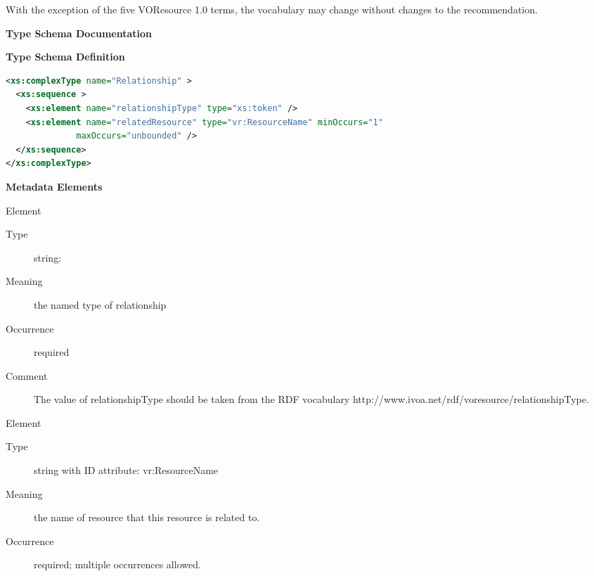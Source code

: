 \documentclass[11pt,a4paper]{ivoa}
\begin{document}
With the exception of the five VOResource 1.0 terms, the vocabulary may
change without changes to the recommendation.

\begingroup
      	\renewcommand*\descriptionlabel[1]{%
      	\hbox to 5.5em{\emph{#1}\hfil}}\vspace{2ex}\noindent\textbf{ Type Schema Documentation}


\vspace{1ex}\noindent\textbf{ Type Schema Definition}

\begin{lstlisting}[language=XML,basicstyle=\footnotesize]
<xs:complexType name="Relationship" >
  <xs:sequence >
    <xs:element name="relationshipType" type="xs:token" />
    <xs:element name="relatedResource" type="vr:ResourceName" minOccurs="1"
              maxOccurs="unbounded" />
  </xs:sequence>
</xs:complexType>
\end{lstlisting}

\vspace{0.5ex}\noindent\textbf{ Metadata Elements}

\begingroup\small\begin{bigdescription}\item[Element \xmlel{relationshipType}]
\begin{description}
\item[Type] string: 
\item[Meaning] 
                  the named type of relationship
               
\item[Occurrence] required
\item[Comment] 
                 The value  of relationshipType should be taken from the RDF
                 vocabulary
                 http://www.ivoa.net/rdf/voresource/relationshipType.
               

\end{description}
\item[Element \xmlel{relatedResource}]
\begin{description}
\item[Type] string with ID attribute: vr:ResourceName
\item[Meaning] 
                  the name of resource that this resource is related to.
               
\item[Occurrence] required; multiple occurrences allowed.

\end{description}


\end{bigdescription}\endgroup
\end{document}
